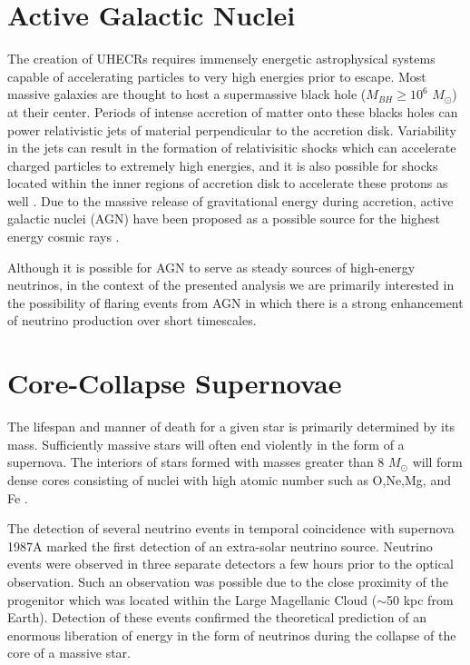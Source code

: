 \documentclass{gatech-thesis}
\begin{document}
\section{Active Galactic Nuclei}
The creation of UHECRs requires immensely energetic astrophysical systems capable of accelerating particles to very high energies prior to escape. Most massive galaxies are thought to host a supermassive black hole ($M_{BH} \geq 10^{6}$ $M_{\odot}$) at their center. Periods of intense accretion of matter onto these blacks holes can power relativistic jets of material perpendicular to the accretion disk. Variability in the jets can result in the formation of relativisitic shocks which can accelerate charged particles to extremely high energies, and it is also possible for shocks located within the inner regions of accretion disk to accelerate these protons as well \cite{1996SSRv...75..341S}. Due to the massive release of gravitational energy during accretion, active galactic nuclei (AGN) have been proposed as a possible source for the highest energy cosmic rays \cite{1996SSRv...75..341S}.

Although it is possible for AGN to serve as steady sources of high-energy neutrinos, in the context of the presented analysis we are primarily interested in the possibility of flaring events from AGN in which there is a strong enhancement of neutrino production over short timescales.

\section{Core-Collapse Supernovae}
The lifespan and manner of death for a given star is primarily determined by its mass. Sufficiently massive stars will often end violently in the form of a supernova. The interiors of stars formed with masses greater than 8 $M_{\odot}$ will form dense cores consisting of nuclei with high atomic number such as O,Ne,Mg, and Fe \cite{2003astro.ph..1006H}. 

The detection of several neutrino events in temporal coincidence with supernova 1987A marked the first detection of an extra-solar neutrino source. Neutrino events were observed in three separate detectors a few hours prior to the optical observation. Such an observation was possible due to the close proximity of the progenitor which was located within the Large Magellanic Cloud ($\sim$50 kpc from Earth). Detection of these events confirmed the theoretical prediction of an enormous liberation of energy in the form of neutrinos during the collapse of the core of a massive star.
\end{document}
